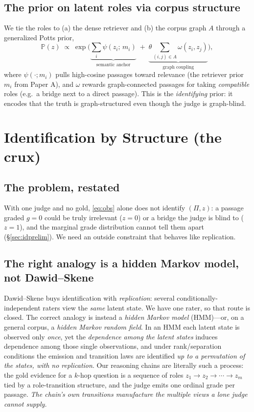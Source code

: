 \documentclass[11pt]{article}
\renewcommand{\Pr}{\mathbb{P}}
\begin{document}
\subsection{The prior on latent roles via corpus structure}
We tie the roles to (a) the dense retriever and (b) the corpus graph $A$ through a generalized Potts prior,
\begin{equation}\label{eq:prior}
  \Pr(z)\;\propto\;\exp\!\Big(\underbrace{\sum_i\psi(z_i;\,m_i)}_{\text{semantic anchor}}\;+\;
  \underbrace{\theta\sum_{(i,j)\in A}\omega(z_i,z_j)}_{\text{graph coupling}}\Big),
\end{equation}
where $\psi(\cdot;m_i)$ pulls high-cosine passages toward relevance (the retriever prior $m_i$ from Paper A),
and $\omega$ rewards graph-connected passages for taking \emph{compatible} roles (e.g.\ a bridge next to a
direct passage). This is the \emph{identifying} prior: it encodes that the truth is graph-structured even
though the judge is graph-blind.

\section{Identification by Structure (the crux)}\label{sec:ident}
\subsection{The problem, restated}
With one judge and no gold, \eqref{eq:obs} alone does not identify $(\Pi,z)$: a passage graded $g{=}0$ could be
truly irrelevant ($z{=}0$) or a bridge the judge is blind to ($z{=}1$), and the marginal grade distribution
cannot tell them apart (\S\ref{sec:idprelim}). We need an outside constraint that behaves like replication.

\subsection{The right analogy is a hidden Markov model, not Dawid--Skene}
Dawid--Skene buys identification with \emph{replication}: several conditionally-independent raters view the
\emph{same} latent state. We have one rater, so that route is closed. The correct analogy is instead a
\emph{hidden Markov model} (HMM)---or, on a general corpus, a \emph{hidden Markov random field}. In an HMM each
latent state is observed only \emph{once}, yet the \emph{dependence among the latent states} induces dependence
among those single observations, and under rank/separation conditions the emission and transition laws are
identified \emph{up to a permutation of the states, with no replication}. Our reasoning chains are literally
such a process: the gold evidence for a $k$-hop question is a sequence of roles
$z_1\!\to\!z_2\!\to\!\cdots\!\to\!z_m$ tied by a role-transition structure, and the judge emits one ordinal
grade per passage. \emph{The chain's own transitions manufacture the multiple views a lone judge cannot supply.}
\end{document}

